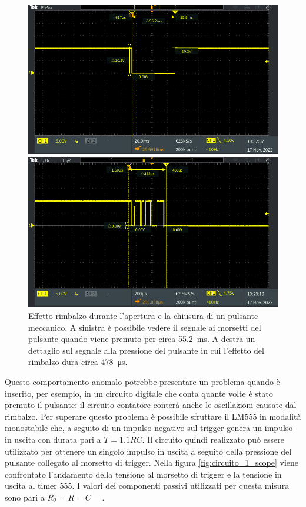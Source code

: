 \begin{figure}[tbh]
	\centering
	\begin{minipage}{.496\textwidth}
		\includegraphics[width=\linewidth]{./ImageFiles/Laboratorio 5/TEK00003.PNG}
	\end{minipage}
	\begin{minipage}{.496\textwidth}
		\includegraphics[width=\linewidth]{./ImageFiles/Laboratorio 5/TEK00002.PNG}
	\end{minipage}
	\caption{Effetto rimbalzo durante l'apertura e la chiusura di un pulsante meccanico. A sinistra è possibile vedere il segnale ai morsetti del pulsante quando viene premuto per circa \SI{55.2}{\milli\second}. A destra un dettaglio sul segnale alla pressione del pulsante in cui l'effetto del rimbalzo dura circa \SI{478}{\micro\second}.}
	\label{fig:switch_bouncing}
\end{figure}
Questo comportamento anomalo potrebbe presentare un problema quando è inserito, per esempio, in un circuito digitale che conta quante volte è stato premuto il pulsante: il circuito contatore conterà anche le oscillazioni causate dal rimbalzo. Per superare questo problema è possibile sfruttare il LM555 in modalità monostabile che, a seguito di un impulso negativo sul trigger genera un impulso in uscita con durata pari a $T=1.1RC$. Il circuito quindi realizzato può essere utilizzato per ottenere un singolo impulso in uscita a seguito della pressione del pulsante collegato al morsetto di trigger. Nella figura \ref{fig:circuito_1_scope} viene confrontato l'andamento della tensione al morsetto di trigger e la tensione in uscita al timer 555. I valori dei componenti passivi utilizzati per questa misura sono pari a $R_2= R= C=$. 
